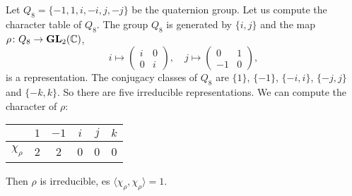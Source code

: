 \begin{example}



\end{example}

\begin{example}
    Let $Q_8=\{-1,1,i,-i,j,-j\}$ be the quaternion group. Let us compute the character table of $Q_8$.
    The group $Q_8$ is generated by $\{i,j\}$ and the map $\rho\colon Q_8\to\mathbf{GL}_2(\mathbb{C})$, 
    \[
    i\mapsto\begin{pmatrix}
    i&0\\0&i
    \end{pmatrix},
    \quad
    j\mapsto\begin{pmatrix}
    0&1\\-1&0
    \end{pmatrix},
    \]
    is a representation.
    The conjugacy classes of $Q_8$ are $\{1\}$, $\{-1\}$, $\{-i,i\}$, $\{-j,j\}$ and $\{-k,k\}$. 
    So there are five irreducible representations. 
    We can compute the character of $\rho$:
    	\begin{center}
		\begin{tabular}{|c|c|c|c|c|c|}
		    \hline
			& $1$ & $-1$ & $i$ & $j$ & $k$\tabularnewline
			\hline
			$\chi_\rho$ & 2 & 2 & 0 & 0 & 0\tabularnewline
			\hline
		\end{tabular}
	\end{center}
	Then $\rho$ is irreducible, es $\langle\chi_\rho,\chi_\rho\rangle=1$. 
	

\end{example}
